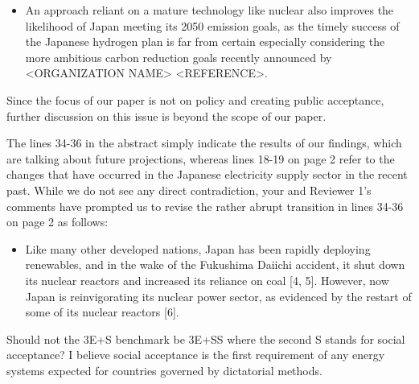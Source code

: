 \documentclass[answers,11pt]{exam}
\begin{document}
\begin{questions}
\begin{solution}
                 \begin{itemize}
                 \item An approach reliant on a mature technology like nuclear also improves the likelihood of Japan meeting its 2050 emission goals, as the timely success of the Japanese hydrogen plan is far from certain especially considering the more ambitious carbon reduction goals recently announced by <ORGANIZATION NAME> <REFERENCE>.
                 \end{itemize}
                 
                  Since the focus of our paper is not on policy and creating public acceptance, further discussion on this issue is beyond the scope of our paper.
                 
                 The lines 34-36 in the abstract simply indicate the results of our findings, which are talking about future projections, whereas lines 18-19 on page 2 refer to the changes that have occurred in the Japanese electricity supply sector in the recent past. While we do not see any direct contradiction, your and Reviewer 1's comments have prompted us to revise the rather abrupt transition in lines 34-36 on page 2 as follows:
                 
                 \begin{itemize}
                 
                  \item  Like many other developed nations, Japan has been rapidly deploying renewables, and in the wake of the Fukushima Daiichi accident, it shut down its nuclear reactors and increased its reliance on coal [4, 5]. However, now Japan is reinvigorating its nuclear power sector, as evidenced by the restart of some of its nuclear reactors [6].
                 
                 \end{itemize}                 
                 
                 
        \end{solution}


  
                        \question  Should not the 3E+S benchmark be 3E+SS where the second S stands for social acceptance? I believe social acceptance is the first requirement of any energy systems expected for countries governed by dictatorial methods.
        

\end{questions}
\end{document}
